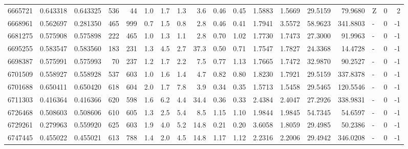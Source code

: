 \begin{tabular}{rrrrrrrrrrrrrrrlrr}
   6665721 & 0.643318 &   0.643325 &  536 &   44 &      1.0 &      1.7 &     1.3 &      3.6 &       0.46 &        0.45 &  1.5883 &  1.5669 &   29.5159 &   79.9680 &             Z &        0 &          2 \\
   6668961 & 0.562697 &   0.281350 &  465 &  999 &      0.7 &      1.5 &     0.8 &      2.8 &       0.46 &        0.41 &  1.7941 &  3.5572 &   58.9623 &  341.8803 &             - &        0 &         -1 \\
   6681275 & 0.575908 &   0.575898 &  222 &  465 &      1.0 &      1.3 &     1.1 &      2.8 &       0.70 &        1.02 &  1.7730 &  1.7473 &   27.3000 &   91.9963 &             - &        0 &         -1 \\
   6695255 & 0.583547 &   0.583560 &  183 &  231 &      1.3 &      4.5 &     2.7 &     37.3 &       0.50 &        0.71 &  1.7547 &  1.7827 &   24.3368 &   14.4728 &             - &        0 &         -1 \\
   6698387 & 0.575991 &   0.575993 &   70 &  237 &      1.2 &      1.7 &     2.2 &      7.5 &       0.77 &        1.13 &  1.7665 &  1.7472 &   32.9870 &   90.2527 &             - &        0 &         -1 \\
   6701509 & 0.558927 &   0.558928 &  537 &  603 &      1.0 &      1.6 &     1.4 &      4.7 &       0.82 &        0.80 &  1.8230 &  1.7921 &   29.5159 &  337.8378 &             - &        0 &         -1 \\
   6701688 & 0.650411 &   0.650420 &  618 &  604 &      2.0 &      1.7 &     7.8 &      3.9 &       0.34 &        0.35 &  1.5713 &  1.5458 &   29.5465 &  120.5546 &             - &        0 &         -1 \\
   6711303 & 0.416364 &   0.416366 &  620 &  598 &      1.6 &      6.2 &     4.4 &     34.4 &       0.36 &        0.33 &  2.4384 &  2.4047 &   27.2926 &  338.9831 &             - &        0 &         -1 \\
   6726468 & 0.508603 &   0.508606 &  610 &  605 &      1.3 &      2.5 &     5.4 &      8.5 &       1.15 &        1.10 &  1.9844 &  1.9845 &   54.7345 &   54.6597 &             - &        0 &         -1 \\
   6729261 & 0.279963 &   0.559920 &  625 &  603 &      1.9 &      4.0 &     5.2 &     14.8 &       0.21 &        0.20 &  3.6058 &  1.8059 &   29.4985 &   50.2386 &             - &        0 &         -1 \\
   6747445 & 0.455022 &   0.455021 &  613 &  788 &      1.4 &      2.0 &     4.5 &     14.8 &       1.17 &        1.12 &  2.2316 &  2.2006 &   29.4942 &  346.0208 &             - &        0 &         -1 \\

\end{tabular}

